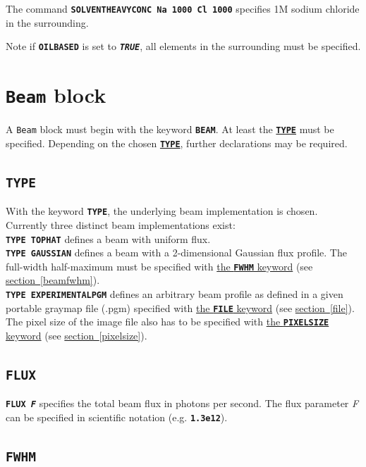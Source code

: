 \documentclass[a4paper]{article}
\newcommand{\Class}[1]{\texttt{#1}\xspace}
\newcommand{\Keyword}[1]{\texttt{\textbf{#1}}\xspace}
\newcommand{\SB}{\\[0.2em]}
\begin{document}
The command \Keyword{SOLVENTHEAVYCONC Na 1000 Cl 1000} specifies 1M sodium chloride in the surrounding.

Note if \Keyword{OILBASED} is set to \Keyword{\textit{TRUE}}, all elements in the surrounding must be specified.

\label{RDv3End}


\section{\Class{Beam} block}

A \Class{Beam} block must begin with the keyword \Keyword{BEAM}.
At least the \hyperref[beamtype]{\Keyword{TYPE}} must be specified.
Depending on the chosen \hyperref[beamtype]{\Keyword{TYPE}}, further declarations may be required.


\subsection{\Keyword{TYPE}}
\label{beamtype}

With the keyword \Keyword{TYPE}, the underlying beam implementation is chosen.
Currently three distinct beam implementations exist:\SB

\noindent \Keyword{TYPE TOPHAT} defines a beam with uniform flux.\SB

\noindent \Keyword{TYPE GAUSSIAN} defines a beam with a 2-dimensional Gaussian flux profile. The full-width half-maximum must be specified with \hyperref[beamfwhm]{the \Keyword{FWHM} keyword} (see \hyperref[beamfwhm]{section~\ref*{beamfwhm}}).\SB

\noindent \Keyword{TYPE EXPERIMENTALPGM} defines an arbitrary beam profile as defined in a given portable graymap file (.pgm) specified with \hyperref[file]{the \Keyword{FILE} keyword} (see \hyperref[file]{section~\ref*{file}}). The pixel size of the image file also has to be specified with \hyperref[pixelsize]{the \Keyword{PIXELSIZE} keyword} (see \hyperref[pixelsize]{section~\ref*{pixelsize}}).\SB


\subsection{\Keyword{FLUX}}
\label{flux}

\noindent \Keyword{FLUX \textit{F}} specifies the total beam flux in photons per second. The flux parameter \textit{F} can be specified in scientific notation (e.g. \Keyword{1.3e12}).


\subsection{\Keyword{FWHM}}
\end{document}

